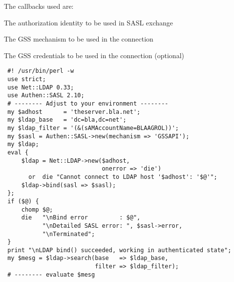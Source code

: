 \documentclass[]{article}
\begin{document}

The callbacks used are:

\begin{description}
\itemsep1pt\parskip0pt
\item[authname]
The authorization identity to be used in SASL exchange
\end{description}

\begin{description}
\itemsep1pt\parskip0pt
\item[gssmech]
The GSS mechanism to be used in the connection
\end{description}

\begin{description}
\itemsep1pt\parskip0pt
\item[pass]
The GSS credentials to be used in the connection (optional)
\end{description}


\begin{verbatim}
 #! /usr/bin/perl -w
 use strict;
 use Net::LDAP 0.33;
 use Authen::SASL 2.10;
 # -------- Adjust to your environment --------
 my $adhost      = 'theserver.bla.net';
 my $ldap_base   = 'dc=bla,dc=net';
 my $ldap_filter = '(&(sAMAccountName=BLAAGROL))';
 my $sasl = Authen::SASL->new(mechanism => 'GSSAPI');
 my $ldap;
 eval {
     $ldap = Net::LDAP->new($adhost,
                            onerror => 'die')
       or  die "Cannot connect to LDAP host '$adhost': '$@'";
     $ldap->bind(sasl => $sasl);
 };
 if ($@) {
     chomp $@;
     die   "\nBind error         : $@",
           "\nDetailed SASL error: ", $sasl->error,
           "\nTerminated";
 }
 print "\nLDAP bind() succeeded, working in authenticated state";
 my $mesg = $ldap->search(base   => $ldap_base,
                          filter => $ldap_filter);
 # -------- evaluate $mesg
\end{verbatim}

\end{document}
